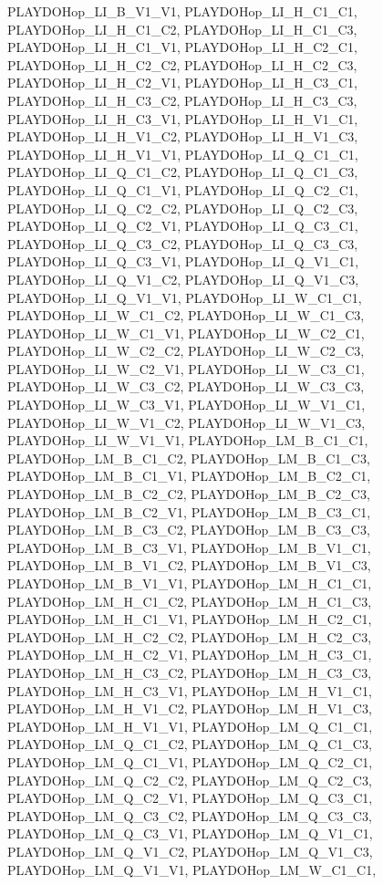 PLAYDOHop\_\-LI\_\-B\_\-V1\_\-V1, PLAYDOHop\_\-LI\_\-H\_\-C1\_\-C1, PLAYDOHop\_\-LI\_\-H\_\-C1\_\-C2, PLAYDOHop\_\-LI\_\-H\_\-C1\_\-C3, PLAYDOHop\_\-LI\_\-H\_\-C1\_\-V1, PLAYDOHop\_\-LI\_\-H\_\-C2\_\-C1, PLAYDOHop\_\-LI\_\-H\_\-C2\_\-C2, PLAYDOHop\_\-LI\_\-H\_\-C2\_\-C3, PLAYDOHop\_\-LI\_\-H\_\-C2\_\-V1, PLAYDOHop\_\-LI\_\-H\_\-C3\_\-C1, PLAYDOHop\_\-LI\_\-H\_\-C3\_\-C2, PLAYDOHop\_\-LI\_\-H\_\-C3\_\-C3, PLAYDOHop\_\-LI\_\-H\_\-C3\_\-V1, PLAYDOHop\_\-LI\_\-H\_\-V1\_\-C1, PLAYDOHop\_\-LI\_\-H\_\-V1\_\-C2, PLAYDOHop\_\-LI\_\-H\_\-V1\_\-C3, PLAYDOHop\_\-LI\_\-H\_\-V1\_\-V1, PLAYDOHop\_\-LI\_\-Q\_\-C1\_\-C1, PLAYDOHop\_\-LI\_\-Q\_\-C1\_\-C2, PLAYDOHop\_\-LI\_\-Q\_\-C1\_\-C3, PLAYDOHop\_\-LI\_\-Q\_\-C1\_\-V1, PLAYDOHop\_\-LI\_\-Q\_\-C2\_\-C1, PLAYDOHop\_\-LI\_\-Q\_\-C2\_\-C2, PLAYDOHop\_\-LI\_\-Q\_\-C2\_\-C3, PLAYDOHop\_\-LI\_\-Q\_\-C2\_\-V1, PLAYDOHop\_\-LI\_\-Q\_\-C3\_\-C1, PLAYDOHop\_\-LI\_\-Q\_\-C3\_\-C2, PLAYDOHop\_\-LI\_\-Q\_\-C3\_\-C3, PLAYDOHop\_\-LI\_\-Q\_\-C3\_\-V1, PLAYDOHop\_\-LI\_\-Q\_\-V1\_\-C1, PLAYDOHop\_\-LI\_\-Q\_\-V1\_\-C2, PLAYDOHop\_\-LI\_\-Q\_\-V1\_\-C3, PLAYDOHop\_\-LI\_\-Q\_\-V1\_\-V1, PLAYDOHop\_\-LI\_\-W\_\-C1\_\-C1, PLAYDOHop\_\-LI\_\-W\_\-C1\_\-C2, PLAYDOHop\_\-LI\_\-W\_\-C1\_\-C3, PLAYDOHop\_\-LI\_\-W\_\-C1\_\-V1, PLAYDOHop\_\-LI\_\-W\_\-C2\_\-C1, PLAYDOHop\_\-LI\_\-W\_\-C2\_\-C2, PLAYDOHop\_\-LI\_\-W\_\-C2\_\-C3, PLAYDOHop\_\-LI\_\-W\_\-C2\_\-V1, PLAYDOHop\_\-LI\_\-W\_\-C3\_\-C1, PLAYDOHop\_\-LI\_\-W\_\-C3\_\-C2, PLAYDOHop\_\-LI\_\-W\_\-C3\_\-C3, PLAYDOHop\_\-LI\_\-W\_\-C3\_\-V1, PLAYDOHop\_\-LI\_\-W\_\-V1\_\-C1, PLAYDOHop\_\-LI\_\-W\_\-V1\_\-C2, PLAYDOHop\_\-LI\_\-W\_\-V1\_\-C3, PLAYDOHop\_\-LI\_\-W\_\-V1\_\-V1, PLAYDOHop\_\-LM\_\-B\_\-C1\_\-C1, PLAYDOHop\_\-LM\_\-B\_\-C1\_\-C2, PLAYDOHop\_\-LM\_\-B\_\-C1\_\-C3, PLAYDOHop\_\-LM\_\-B\_\-C1\_\-V1, PLAYDOHop\_\-LM\_\-B\_\-C2\_\-C1, PLAYDOHop\_\-LM\_\-B\_\-C2\_\-C2, PLAYDOHop\_\-LM\_\-B\_\-C2\_\-C3, PLAYDOHop\_\-LM\_\-B\_\-C2\_\-V1, PLAYDOHop\_\-LM\_\-B\_\-C3\_\-C1, PLAYDOHop\_\-LM\_\-B\_\-C3\_\-C2, PLAYDOHop\_\-LM\_\-B\_\-C3\_\-C3, PLAYDOHop\_\-LM\_\-B\_\-C3\_\-V1, PLAYDOHop\_\-LM\_\-B\_\-V1\_\-C1, PLAYDOHop\_\-LM\_\-B\_\-V1\_\-C2, PLAYDOHop\_\-LM\_\-B\_\-V1\_\-C3, PLAYDOHop\_\-LM\_\-B\_\-V1\_\-V1, PLAYDOHop\_\-LM\_\-H\_\-C1\_\-C1, PLAYDOHop\_\-LM\_\-H\_\-C1\_\-C2, PLAYDOHop\_\-LM\_\-H\_\-C1\_\-C3, PLAYDOHop\_\-LM\_\-H\_\-C1\_\-V1, PLAYDOHop\_\-LM\_\-H\_\-C2\_\-C1, PLAYDOHop\_\-LM\_\-H\_\-C2\_\-C2, PLAYDOHop\_\-LM\_\-H\_\-C2\_\-C3, PLAYDOHop\_\-LM\_\-H\_\-C2\_\-V1, PLAYDOHop\_\-LM\_\-H\_\-C3\_\-C1, PLAYDOHop\_\-LM\_\-H\_\-C3\_\-C2, PLAYDOHop\_\-LM\_\-H\_\-C3\_\-C3, PLAYDOHop\_\-LM\_\-H\_\-C3\_\-V1, PLAYDOHop\_\-LM\_\-H\_\-V1\_\-C1, PLAYDOHop\_\-LM\_\-H\_\-V1\_\-C2, PLAYDOHop\_\-LM\_\-H\_\-V1\_\-C3, PLAYDOHop\_\-LM\_\-H\_\-V1\_\-V1, PLAYDOHop\_\-LM\_\-Q\_\-C1\_\-C1, PLAYDOHop\_\-LM\_\-Q\_\-C1\_\-C2, PLAYDOHop\_\-LM\_\-Q\_\-C1\_\-C3, PLAYDOHop\_\-LM\_\-Q\_\-C1\_\-V1, PLAYDOHop\_\-LM\_\-Q\_\-C2\_\-C1, PLAYDOHop\_\-LM\_\-Q\_\-C2\_\-C2, PLAYDOHop\_\-LM\_\-Q\_\-C2\_\-C3, PLAYDOHop\_\-LM\_\-Q\_\-C2\_\-V1, PLAYDOHop\_\-LM\_\-Q\_\-C3\_\-C1, PLAYDOHop\_\-LM\_\-Q\_\-C3\_\-C2, PLAYDOHop\_\-LM\_\-Q\_\-C3\_\-C3, PLAYDOHop\_\-LM\_\-Q\_\-C3\_\-V1, PLAYDOHop\_\-LM\_\-Q\_\-V1\_\-C1, PLAYDOHop\_\-LM\_\-Q\_\-V1\_\-C2, PLAYDOHop\_\-LM\_\-Q\_\-V1\_\-C3, PLAYDOHop\_\-LM\_\-Q\_\-V1\_\-V1, PLAYDOHop\_\-LM\_\-W\_\-C1\_\-C1, 